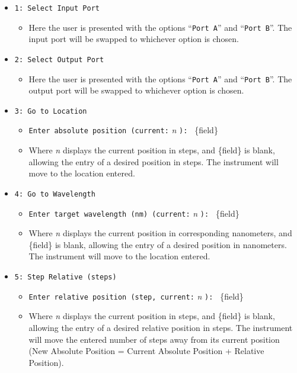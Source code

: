 \documentclass{article}
\begin{document}
\begin{itemize}
    \item \verb|1: Select Input Port|
    \begin{itemize}
        \item Here the user is presented with the options ``\verb|Port A|'' and ``\verb|Port B|''. The input port will be swapped to whichever option is chosen.
    \end{itemize}
    \item \verb|2: Select Output Port|
    \begin{itemize}
        \item Here the user is presented with the options ``\verb|Port A|'' and ``\verb|Port B|''. The output port will be swapped to whichever option is chosen.
    \end{itemize}
    \item \verb|3: Go to Location|
    \begin{itemize}
        \item \verb|Enter absolute position (current:| \emph{n} \verb|): | \{field\}
        \item Where \emph{n} displays the current position in steps, and \{field\} is blank, allowing the entry of a desired position in steps. The instrument will move to the location entered.
    \end{itemize}
    \item \verb|4: Go to Wavelength|
    \begin{itemize}
        \item \verb|Enter target wavelength (nm) (current:| \emph{n} \verb|): | \{field\}
        \item Where \emph{n} displays the current position in corresponding nanometers, and \{field\} is blank, allowing the entry of a desired position in nanometers. The instrument will move to the location entered.
    \end{itemize}
    \item \verb|5: Step Relative (steps)|
    \begin{itemize}
        \item \verb|Enter relative position (step, current:| \emph{n} \verb|): | \{field\}
        \item Where \emph{n} displays the current position in steps, and \{field\} is blank, allowing the entry of a desired relative position in steps. The instrument will move the entered number of steps away from its current position (New Absolute Position = Current Absolute Position + Relative Position).

\end{itemize}
\end{itemize}
\end{document}
